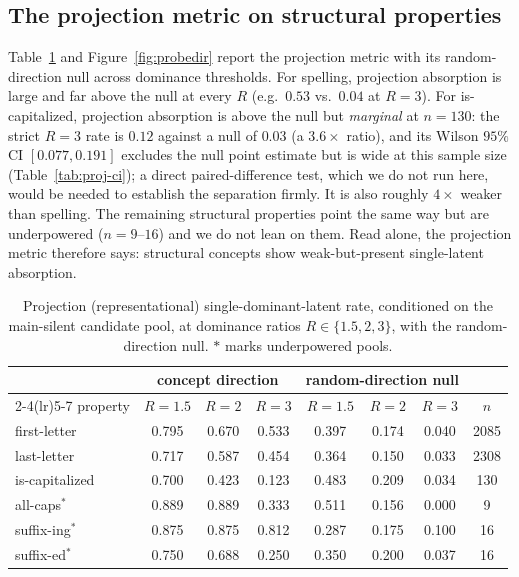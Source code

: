 \documentclass[11pt]{article}
\newcommand{\iscap}{\textsf{is-capitalized}}
\newcommand{\allcaps}{\textsf{all-caps}}
\newcommand{\suffing}{\textsf{suffix-ing}}
\newcommand{\suffed}{\textsf{suffix-ed}}
\theoremstyle{definition}
\begin{document}
\subsection{The projection metric on structural properties}\label{sec:proj}
Table~\ref{tab:proj} and Figure~\ref{fig:probedir} report the projection metric with its random-direction
null across dominance thresholds. For spelling, projection absorption is large and far above the null at
every $R$ (e.g.\ $0.53$ vs.\ $0.04$ at $R{=}3$). For \iscap{}, projection absorption is above the null but
\emph{marginal} at $n{=}130$: the strict $R{=}3$ rate is $0.12$ against a null of $0.03$ (a $3.6\times$
ratio), and its Wilson $95\%$ CI $[0.077,0.191]$ excludes the null point estimate but is wide at this
sample size (Table~\ref{tab:proj-ci}); a direct paired-difference test, which we do not run here, would be
needed to establish the separation firmly. It is also roughly $4\times$ weaker than spelling. The remaining
structural properties point the same way but are underpowered ($n{=}9$--$16$) and we do not lean on them.
Read alone, the projection metric therefore says: structural concepts show weak-but-present single-latent
absorption.

\begin{table}[t]
  \centering
  \caption{Projection (representational) single-dominant-latent rate, conditioned on the main-silent
  candidate pool, at dominance ratios $R\in\{1.5,2,3\}$, with the random-direction null. $\ast$ marks
  underpowered pools.}\label{tab:proj}
  \small
  \begin{tabular}{lccc@{\hskip 1.2em}ccc@{\hskip 1.2em}c}
    \toprule
    & \multicolumn{3}{c}{concept direction} & \multicolumn{3}{c}{random-direction null} & \\
    \cmidrule(lr){2-4}\cmidrule(lr){5-7}
    property & $R{=}1.5$ & $R{=}2$ & $R{=}3$ & $R{=}1.5$ & $R{=}2$ & $R{=}3$ & $n$ \\
    \midrule
    first-letter & 0.795 & 0.670 & 0.533 & 0.397 & 0.174 & 0.040 & 2085 \\
    last-letter  & 0.717 & 0.587 & 0.454 & 0.364 & 0.150 & 0.033 & 2308 \\
    \iscap{}     & 0.700 & 0.423 & 0.123 & 0.483 & 0.209 & 0.034 & 130 \\
    \allcaps{}$^\ast$   & 0.889 & 0.889 & 0.333 & 0.511 & 0.156 & 0.000 & 9 \\
    \suffing{}$^\ast$   & 0.875 & 0.875 & 0.812 & 0.287 & 0.175 & 0.100 & 16 \\
    \suffed{}$^\ast$    & 0.750 & 0.688 & 0.250 & 0.350 & 0.200 & 0.037 & 16 \\
    \bottomrule
  \end{tabular}
\end{table}
\end{document}
